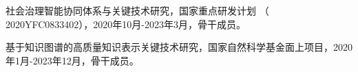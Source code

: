 
\begin{projects}{99}

    \item 社会治理智能协同体系与关键技术研究，国家重点研发计划 （ 2020YFC0833402），2020年10月-2023年3月，骨干成员。

    \item 基于知识图谱的高质量知识表示关键技术研究，国家自然科学基金面上项目，2020年1月-2023年12月，骨干成员。

\end{projects}
